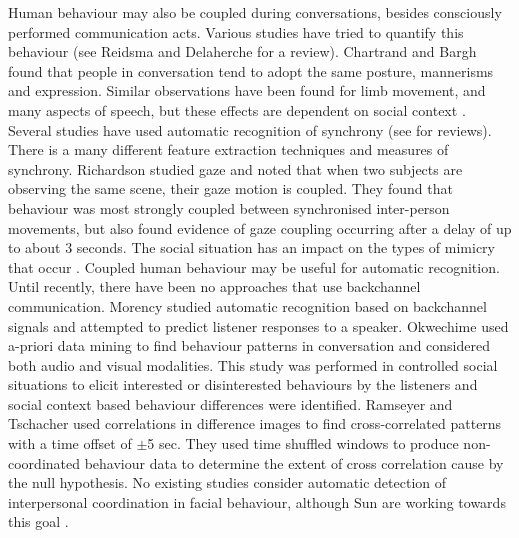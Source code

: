 Human behaviour may also be coupled during conversations, besides consciously performed communication acts. Various studies have tried to quantify this behaviour (see Reidsma \etal \cite{Reidsma2010} and Delaherche \cite{Delaherche2012} for a review). Chartrand and Bargh \cite{Chartrand1999} found that people in conversation tend to adopt the same posture, mannerisms and expression. Similar observations have been found for limb movement, and many aspects of speech, but these effects are dependent on social context \cite{Frith2009}. 
Several studies have used automatic recognition of synchrony (see \cite{Delaherche2012, Sun2012} for reviews). There is a many different feature extraction techniques and measures of synchrony. Richardson \etal \cite{Richardson2007} studied gaze and noted that when two subjects are observing the same scene, their gaze motion is coupled. They found that behaviour was most strongly coupled between synchronised inter-person movements, but also found evidence of gaze coupling occurring after a delay of up to about 3 seconds. The social situation has an impact on the types of mimicry that occur \cite{Bourgeois2008}. Coupled human behaviour may be useful for automatic recognition. Until recently, there have been no approaches that use backchannel communication. Morency \cite{Morency2011} studied automatic recognition based on backchannel signals and attempted to predict listener responses to a speaker. Okwechime \etal \cite{Okwechime2011} used a-priori data mining to find behaviour patterns in conversation and considered both audio and visual modalities. This study was performed in controlled social situations to elicit interested or disinterested behaviours by the listeners and social context based behaviour differences were identified. %
Ramseyer and Tschacher \cite{Ramseyer2008} used correlations in difference images to find cross-correlated patterns with a time offset of $\pm$5 sec. They used time shuffled windows to produce non-coordinated behaviour data to determine the extent of cross correlation cause by the null hypothesis. No existing studies consider automatic detection of interpersonal coordination in facial behaviour, although Sun \etal are working towards this goal \cite{Sun2012}.

